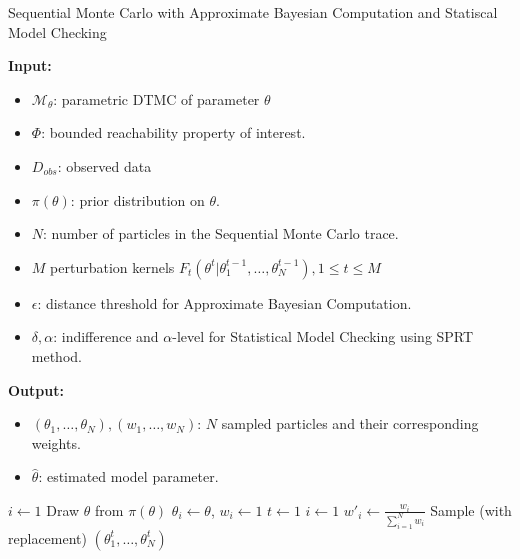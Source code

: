\begin{algorithm}[H]
    \caption{Sequential Monte Carlo with Approximate Bayesian Computation and Statiscal Model Checking}
    \label{smc-abc-smc-alg}
    \footnotesize{
        \hspace*{\algorithmicindent} \textbf{Input:}
        \begin{itemize}[noitemsep,topsep=0pt]
            \item $\mathcal{M}_\theta$: parametric DTMC of parameter $\theta$
            \item $\Phi$: bounded reachability property of interest.
            \item $D_{obs}$: observed data
            \item $\pi(\theta)$: prior distribution on $\theta$.
            \item $N$: number of particles in the Sequential Monte Carlo trace.
            \item $M$ perturbation kernels $F_t(\theta^t | \theta^{t-1}_1,\ldots,\theta^{t-1}_N), 1\leq t \leq M$
            \item $\epsilon$: distance threshold for Approximate Bayesian Computation.
            \item $\delta, \alpha$: indifference and $\alpha$-level for Statistical Model Checking using SPRT method.
        \end{itemize}
        \hspace*{\algorithmicindent} \textbf{Output:}
        \begin{itemize}[noitemsep,topsep=0pt]
            \item $(\theta_1,\ldots,\theta_N), (w_1,\ldots,w_N)$: $N$ sampled particles and their corresponding weights.
            \item $\hat{\theta}$: estimated model parameter.
        \end{itemize}
    }
    \begin{algorithmic}[1]
        \State $i \leftarrow 1$
         
        \State Draw $\theta$ from $\pi(\theta)$
        \State $\theta_i \leftarrow \theta$, $w_i \leftarrow 1$
        \EndWhile
        \State $t \leftarrow 1$
        \State $i \leftarrow 1$ 
        \State $w'_i \leftarrow \frac{w_i}{\sum_{i=1}^N w_i} $
        \EndWhile
        \State Sample (with replacement) $(\theta^t_1,\ldots,\theta^t_N)$ \\

\end{algorithmic}
\end{algorithm}
